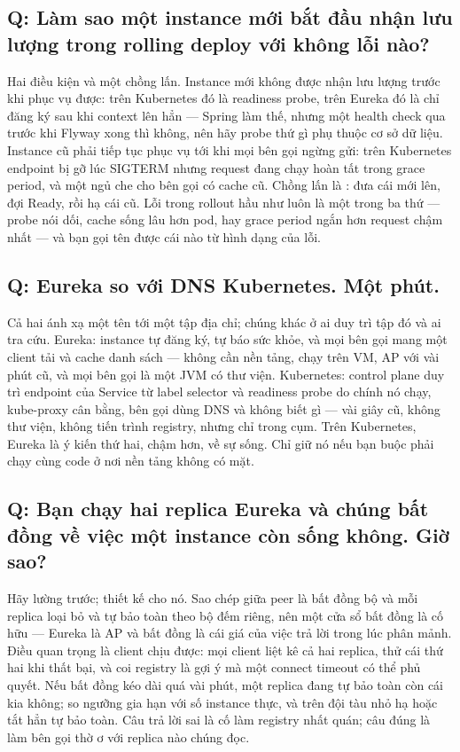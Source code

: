 \subsection*{Q: Làm sao một instance mới bắt đầu nhận lưu lượng trong
rolling deploy với không lỗi nào?}

Hai điều kiện và một chồng lấn. Instance mới không được nhận lưu lượng
trước khi phục vụ được: trên Kubernetes đó là readiness probe, trên
Eureka đó là chỉ đăng ký sau khi context lên hẳn --- Spring làm thế,
nhưng một health check qua trước khi Flyway xong thì không, nên hãy
probe thứ gì phụ thuộc cơ sở dữ liệu. Instance cũ phải tiếp tục phục vụ
tới khi mọi bên gọi ngừng gửi: trên Kubernetes endpoint bị gỡ lúc
SIGTERM nhưng request đang chạy hoàn tất trong grace period, và một
 ngủ che cho bên gọi có cache cũ. Chồng lấn là
: đưa cái mới lên, đợi Ready, rồi
hạ cái cũ. Lỗi trong rollout hầu như luôn là một trong ba thứ --- probe
nói dối, cache sống lâu hơn pod, hay grace period ngắn hơn request chậm
nhất --- và bạn gọi tên được cái nào từ hình dạng của lỗi.

\subsection*{Q: Eureka so với DNS Kubernetes. Một phút.}

Cả hai ánh xạ một tên tới một tập địa chỉ; chúng khác ở ai duy trì tập
đó và ai tra cứu. Eureka: instance tự đăng ký, tự báo sức khỏe, và mọi
bên gọi mang một client tải và cache danh sách --- không cần nền tảng,
chạy trên VM, AP với vài phút cũ, và mọi bên gọi là một JVM có thư
viện. Kubernetes: control plane duy trì endpoint của Service từ label
selector và readiness probe do chính nó chạy, kube-proxy cân bằng, bên
gọi dùng DNS và không biết gì --- vài giây cũ, không thư viện, không
tiến trình registry, nhưng chỉ trong cụm. Trên Kubernetes, Eureka là ý
kiến thứ hai, chậm hơn, về sự sống. Chỉ giữ nó nếu bạn buộc phải chạy
cùng code ở nơi nền tảng không có mặt.

\subsection*{Q: Bạn chạy hai replica Eureka và chúng bất đồng về việc
một instance còn sống không. Giờ sao?}

Hãy lường trước; thiết kế cho nó. Sao chép giữa peer là bất đồng bộ và
mỗi replica loại bỏ và tự bảo toàn theo bộ đếm riêng, nên một cửa sổ
bất đồng là cố hữu --- Eureka là AP và bất đồng là cái giá của việc trả
lời trong lúc phân mảnh. Điều quan trọng là client chịu được: mọi
client liệt kê cả hai replica, thử cái thứ hai khi thất bại, và coi
registry là gợi ý mà một connect timeout có thể phủ quyết. Nếu bất
đồng kéo dài quá vài phút, một replica đang tự bảo toàn còn cái kia
không; so ngưỡng gia hạn với số instance thực, và trên đội tàu nhỏ hạ
 hoặc tắt hẳn tự bảo toàn. Câu trả lời
sai là cố làm registry nhất quán; câu đúng là làm bên gọi thờ ơ với
replica nào chúng đọc.

